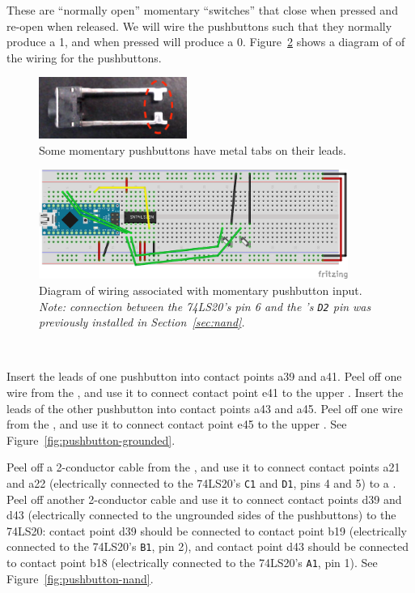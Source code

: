 These are ``normally open'' momentary ``switches'' that close when pressed and
re-open when released. We will wire the pushbuttons such that they normally
produce a 1, and when pressed will produce a 0.
Figure~\ref{fig:pushbutton-diagram} shows a diagram of of the wiring for the
pushbuttons.

\begin{figure}
    \centering
    \includegraphics[height=2cm]{pushbutton-tabs}
    \caption{Some momentary pushbuttons have metal tabs on their leads.\label{fig:pushbutton-tabs}}
\end{figure}

\begin{figure}
    \centering
    \includegraphics[width=0.9\textwidth]{fritzing_images/pushbutton}
    \caption{Diagram of wiring associated with momentary pushbutton input.
        \textit{Note: connection between the 74LS20's pin 6 and the \nano's
        \texttt{D2} pin was previously installed in Section~\ref{sec:nand}.}
        \label{fig:pushbutton-diagram}}
\end{figure}

\disconnect\

Insert the leads of one pushbutton into contact points a39 and a41. Peel off
one wire from the \rainbow, and use it to connect contact point e41 to the
upper \ground. Insert the leads of the other pushbutton into contact points a43
and a45. Peel off one wire from the \rainbow, and use it to connect contact
point e45 to the upper \ground. See Figure~\ref{fig:pushbutton-grounded}.

Peel off a 2-conductor cable from the \rainbow, and use it to connect contact
points a21 and a22 (electrically connected to the 74LS20's \texttt{C1} and
\texttt{D1}, pins 4 and 5) to a \power. Peel off another 2-conductor cable and
use it to connect contact points d39 and d43 (electrically connected to the
ungrounded sides of the pushbuttons) to the 74LS20: contact point d39 should be
connected to contact point b19 (electrically connected to the 74LS20's
\texttt{B1}, pin 2), and contact point d43 should be connected to contact point
b18 (electrically connected to the 74LS20's \texttt{A1}, pin 1). See
Figure~\ref{fig:pushbutton-nand}.


